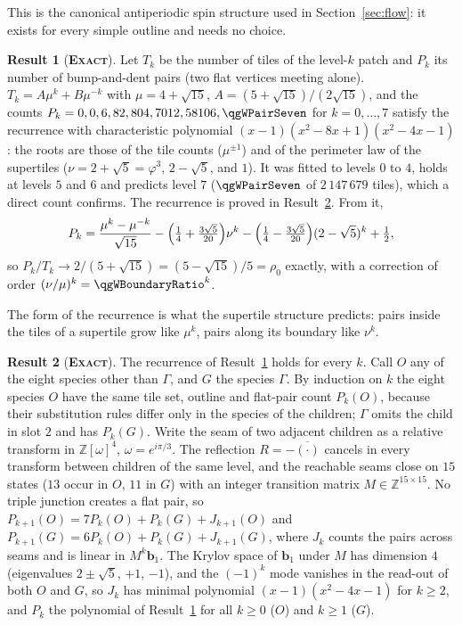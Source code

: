 \documentclass[11pt]{article}
\newcommand{\exact}{\textbf{\textsc{Exact}}}
\theoremstyle{definition}
\newtheorem{result}{Result}
\begin{document}
This is the canonical antiperiodic spin structure used in Section~\ref{sec:flow}: it exists for every simple outline and needs no choice.

\begin{result}[\exact]\label{res:found-pairs}
Let $T_k$ be the number of tiles of the level-$k$ patch and $P_k$ its number of bump-and-dent pairs (two flat vertices meeting alone). $T_k=A\mu^k+B\mu^{-k}$ with $\mu=4+\sqrt{15}$, $A=(5+\sqrt{15})/(2\sqrt{15})$, and the counts $P_k=0,0,6,82,804,7012,58106,\qgWPairSeven$ for $k=0,\dots,7$ satisfy the recurrence with characteristic polynomial $(x-1)(x^2-8x+1)(x^2-4x-1)$: the roots are those of the tile counts ($\mu^{\pm1}$) and of the perimeter law of the supertiles ($\nu=2+\sqrt5=\varphi^3$, $2-\sqrt5$, and $1$). It was fitted to levels $0$ to $4$, holds at levels $5$ and $6$ and predicts level $7$ ($\qgWPairSeven$ of $2\,147\,679$ tiles), which a direct count confirms. The recurrence is proved in Result~\ref{res:found-pairs-proof}. From it,
\[
P_k=\frac{\mu^k-\mu^{-k}}{\sqrt{15}}-\Bigl(\tfrac14+\tfrac{3\sqrt5}{20}\Bigr)\nu^k-\Bigl(\tfrac14-\tfrac{3\sqrt5}{20}\Bigr)(2-\sqrt5)^k+\tfrac12,
\]
so $P_k/T_k\to 2/(5+\sqrt{15})=(5-\sqrt{15})/5=\rho_0$ exactly, with a correction of order $(\nu/\mu)^k=\qgWBoundaryRatio^k$.
\end{result}
The form of the recurrence is what the supertile structure predicts: pairs inside the tiles of a supertile grow like $\mu^k$, pairs along its boundary like $\nu^k$.
\begin{result}[\exact]\label{res:found-pairs-proof}
The recurrence of Result~\ref{res:found-pairs} holds for every $k$. Call $O$ any of the eight species other than $\Gamma$, and $G$ the species $\Gamma$. By induction on $k$ the eight species $O$ have the same tile set, outline and flat-pair count $P_k(O)$, because their substitution rules differ only in the species of the children; $\Gamma$ omits the child in slot $2$ and has $P_k(G)$. Write the seam of two adjacent children as a relative transform in $\mathbb{Z}[\omega]^4$, $\omega=e^{i\pi/3}$. The reflection $R=-\overline{(\cdot)}$ cancels in every transform between children of the same level, and the reachable seams close on $15$ states ($13$ occur in $O$, $11$ in $G$) with an integer transition matrix $M\in\mathbb{Z}^{15\times15}$. No triple junction creates a flat pair, so $P_{k+1}(O)=7P_k(O)+P_k(G)+J_{k+1}(O)$ and $P_{k+1}(G)=6P_k(O)+P_k(G)+J_{k+1}(G)$, where $J_k$ counts the pairs across seams and is linear in $M^k\mathbf b_1$. The Krylov space of $\mathbf b_1$ under $M$ has dimension $4$ (eigenvalues $2\pm\sqrt5$, $+1$, $-1$), and the $(-1)^k$ mode vanishes in the read-out of both $O$ and $G$, so $J_k$ has minimal polynomial $(x-1)(x^2-4x-1)$ for $k\ge2$, and $P_k$ the polynomial of Result~\ref{res:found-pairs} for all $k\ge0$ ($O$) and $k\ge1$ ($G$).
\end{result}
\end{document}
